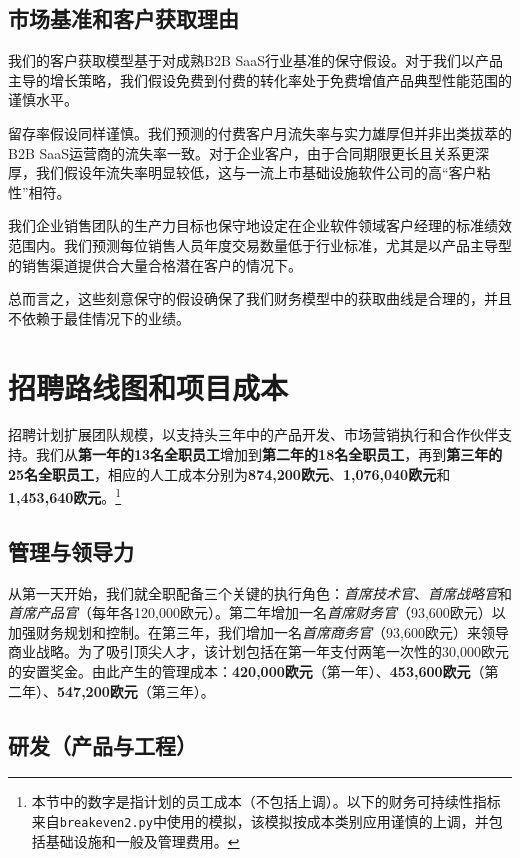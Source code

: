 \documentclass[11点, A4纸, 单面]{article}
\begin{document}
\subsection{市场基准和客户获取理由}

我们的客户获取模型基于对成熟B2B SaaS行业基准的保守假设。对于我们以产品主导的增长策略，我们假设免费到付费的转化率处于免费增值产品典型性能范围的谨慎水平。

留存率假设同样谨慎。我们预测的付费客户月流失率与实力雄厚但并非出类拔萃的B2B SaaS运营商的流失率一致。对于企业客户，由于合同期限更长且关系更深厚，我们假设年流失率明显较低，这与一流上市基础设施软件公司的高“客户粘性”相符。

我们企业销售团队的生产力目标也保守地设定在企业软件领域客户经理的标准绩效范围内。我们预测每位销售人员年度交易数量低于行业标准，尤其是以产品主导型的销售渠道提供合大量合格潜在客户的情况下。

总而言之，这些刻意保守的假设确保了我们财务模型中的获取曲线是合理的，并且不依赖于最佳情况下的业绩。

\newpage
\section{招聘路线图和项目成本}
\label{sec:hiring-roadmap}

招聘计划扩展团队规模，以支持头三年中的产品开发、市场营销执行和合作伙伴支持。我们从\textbf{第一年的13名全职员工}增加到\textbf{第二年的18名全职员工}，再到\textbf{第三年的25名全职员工}，相应的人工成本分别为\textbf{874,200欧元}、\textbf{1,076,040欧元}和\textbf{1,453,640欧元}。\footnote{本节中的数字是指计划的员工成本（不包括上调）。以下的财务可持续性指标来自\texttt{breakeven2.py}中使用的模拟，该模拟按成本类别应用谨慎的上调，并包括基础设施和一般及管理费用。}

\subsection{管理与领导力}

从第一天开始，我们就全职配备三个关键的执行角色：\textit{首席技术官}、\textit{首席战略官}和\textit{首席产品官}（每年各120,000欧元）。第二年增加一名\textit{首席财务官}（93,600欧元）以加强财务规划和控制。在第三年，我们增加一名\textit{首席商务官}（93,600欧元）来领导商业战略。为了吸引顶尖人才，该计划包括在第一年支付两笔一次性的30,000欧元的安置奖金。由此产生的管理成本：\textbf{420,000欧元}（第一年）、\textbf{453,600欧元}（第二年）、\textbf{547,200欧元}（第三年）。

\subsection{研发（产品与工程）}
\end{document}
